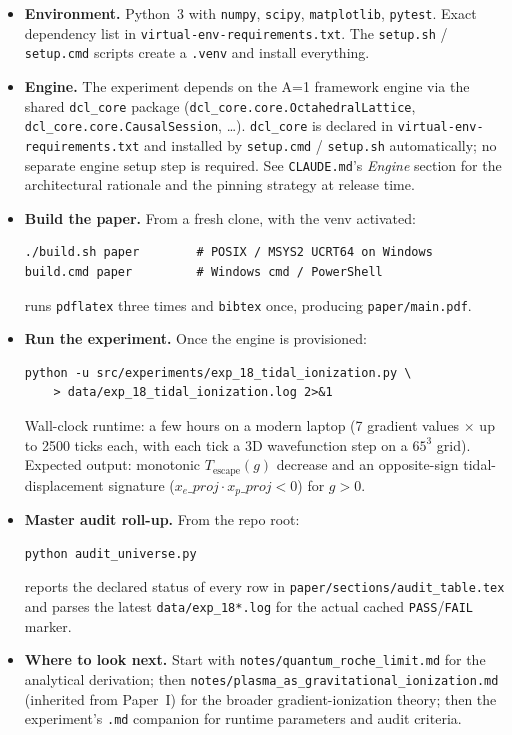 \label{sec:reproducibility}

\begin{itemize}
\item \textbf{Environment.}  Python~3 with \texttt{numpy},
      \texttt{scipy}, \texttt{matplotlib}, \texttt{pytest}.
      Exact dependency list in
      \texttt{virtual-env-requirements.txt}.  The \texttt{setup.sh}
      / \texttt{setup.cmd} scripts create a \texttt{.venv} and
      install everything.

\item \textbf{Engine.}  The experiment depends on the A=1 framework
      engine via the shared \texttt{dcl\_core} package
      (\texttt{dcl\_core.core.OctahedralLattice},
      \texttt{dcl\_core.core.CausalSession}, \dots).
      \texttt{dcl\_core} is declared in
      \texttt{virtual-env-requirements.txt} and installed by
      \texttt{setup.cmd} / \texttt{setup.sh} automatically; no
      separate engine setup step is required.  See \texttt{CLAUDE.md}'s
      \emph{Engine} section for the architectural rationale and the
      pinning strategy at release time.

\item \textbf{Build the paper.}  From a fresh clone, with the venv
      activated:
      \begin{verbatim}
./build.sh paper        # POSIX / MSYS2 UCRT64 on Windows
build.cmd paper         # Windows cmd / PowerShell
      \end{verbatim}
      runs \texttt{pdflatex} three times and \texttt{bibtex} once,
      producing \texttt{paper/main.pdf}.

\item \textbf{Run the experiment.}  Once the engine is provisioned:
      \begin{verbatim}
python -u src/experiments/exp_18_tidal_ionization.py \
    > data/exp_18_tidal_ionization.log 2>&1
      \end{verbatim}
      Wall-clock runtime: a few hours on a modern laptop (7
      gradient values $\times$ up to 2500 ticks each, with each
      tick a 3D wavefunction step on a $65^3$ grid).  Expected
      output: monotonic $T_\text{escape}(g)$ decrease and an
      opposite-sign tidal-displacement signature
      ($x_e\_proj \cdot x_p\_proj < 0$) for $g > 0$.

\item \textbf{Master audit roll-up.}  From the repo root:
      \begin{verbatim}
python audit_universe.py
      \end{verbatim}
      reports the declared status of every row in
      \texttt{paper/sections/audit\_table.tex} and parses the
      latest \texttt{data/exp\_18*.log} for the actual cached
      \texttt{PASS}/\texttt{FAIL} marker.

\item \textbf{Where to look next.}  Start with
      \texttt{notes/quantum\_roche\_limit.md} for the analytical
      derivation; then
      \texttt{notes/plasma\_as\_gravitational\_ionization.md}
      (inherited from Paper~I) for the broader gradient-ionization
      theory; then the experiment's \texttt{.md} companion for
      runtime parameters and audit criteria.
\end{itemize}
